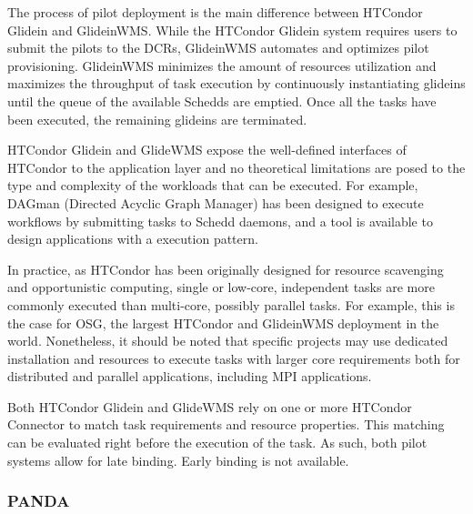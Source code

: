 \documentclass{sig-alternate}
\begin{document}
The process of pilot deployment is the main difference between HTCondor Glidein
and GlideinWMS. While the HTCondor Glidein system requires users to submit the
pilots to the DCRs, GlideinWMS automates and optimizes pilot provisioning.
GlideinWMS minimizes the amount of resources utilization and maximizes the
throughput of task execution by continuously instantiating glideins until the
queue of the available Schedds are emptied. Once all the tasks have been
executed, the remaining glideins are terminated.

HTCondor Glidein and GlideWMS expose the well-defined interfaces of HTCondor to
the application layer and no theoretical limitations are posed to the type and
complexity of the workloads that can be executed. For example, DAGman (Directed
Acyclic Graph Manager) has been designed to execute workflows by submitting
tasks to Schedd daemons, and a \MW tool is available to design applications with
a \MW execution pattern.

In practice, as HTCondor has been originally designed for resource scavenging
and opportunistic computing, single or low-core, independent tasks are more
commonly executed than multi-core, possibly parallel tasks. For example, this is
the case for OSG, the largest HTCondor and GlideinWMS deployment in the world.
Nonetheless, it should be noted that specific projects may use dedicated
installation and resources to execute tasks with larger core requirements both
for distributed and parallel applications, including MPI applications.

Both HTCondor Glidein and GlideWMS rely on one or more HTCondor Connector to
match task requirements and resource properties. This matching can be evaluated
right before the execution of the task. As such, both pilot systems allow for
late binding. Early binding is not available.

%
\subsubsection{PANDA}
\label{sec:panda}



\end{document}
